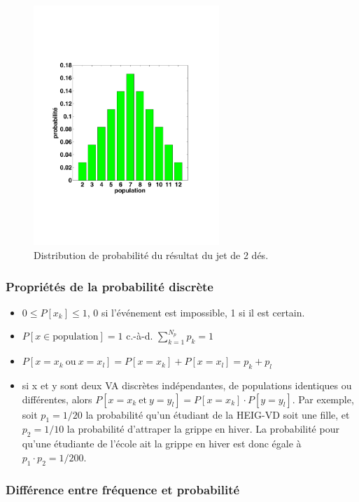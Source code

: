 \documentclass[main.tex]{subfiles}
\begin{document}
\begin{figure}[h]
    \centering
    \includegraphics[width=7cm]{assets/figures/Serie2_exe01fig1.pdf}
    \caption{Distribution de probabilité du résultat du jet de 2 dés.}
    \label{fig:ddjddd}
\end{figure}

\subsubsection{Propriétés de la probabilité discrète}

\begin{itemize}
    \item $0\le P[x_k]\le 1$, 0 si l'événement est impossible, 1 si il est certain.
    \item $P[x\in\text{population}]=1$ c.-à-d. $\sum_{k=1}^{N_p} p_k=1$
    \item $P[x=x_k\ \text{ou}\ x=x_l]=P[x=x_k]+P[x=x_l]=p_k+p_l$
    \item si x et y sont deux VA discrètes indépendantes, de populations identiques ou différentes, alors $P[x=x_k\ \text{et}\ y=y_l]=P[x=x_k]\cdot P[y=y_l]$. Par exemple, soit $p_1=1/20$ la probabilité qu'un étudiant de la HEIG-VD soit une fille, et $p_2=1/10$ la probabilité d'attraper la grippe en hiver. La probabilité pour qu'une étudiante de l'école ait la grippe en hiver est donc égale à $p_1\cdot p_2=1/200$.
\end{itemize}

\subsubsection{Différence entre fréquence et probabilité}
\end{document}
